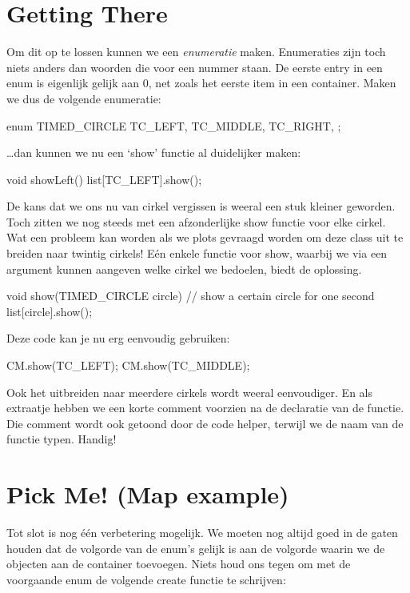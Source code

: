\section{Getting There}

Om dit op te lossen kunnen we een \textsl{enumeratie} maken. Enumeraties zijn toch niets anders dan woorden die voor een nummer staan. De eerste entry in een enum is eigenlijk gelijk aan 0, net zoals het eerste item in een container. Maken we dus de volgende enumeratie:

\begin{code}
enum TIMED_CIRCLE {
  TC_LEFT,
  TC_MIDDLE,
  TC_RIGHT,
};
\end{code}

\ldots dan kunnen we nu een `show' functie al duidelijker maken:

\begin{code}
void showLeft() {
  list[TC_LEFT].show();
}
\end{code}

De kans dat we ons nu van cirkel vergissen is weeral een stuk kleiner geworden. Toch zitten we nog steeds met een afzonderlijke show functie voor elke cirkel. Wat een probleem kan worden als we plots gevraagd worden om deze class uit te breiden naar twintig cirkels! E\'en enkele functie voor show, waarbij we via een argument kunnen aangeven welke cirkel we bedoelen, biedt de oplossing.

\begin{code}
void show(TIMED_CIRCLE circle) { // show a certain circle for one second
  list[circle].show();
}
\end{code}

Deze code kan je nu erg eenvoudig gebruiken:
\begin{code}
CM.show(TC_LEFT);
CM.show(TC_MIDDLE);
\end{code}

Ook het uitbreiden naar meerdere cirkels wordt weeral eenvoudiger. En als extraatje hebben we een korte comment voorzien na de declaratie van de functie. Die comment wordt ook getoond door de code helper, terwijl we de naam van de functie typen. Handig!

\section{Pick Me! (Map example)}

Tot slot is nog \'e\'en verbetering mogelijk. We moeten nog altijd goed in de gaten houden dat de volgorde van de enum's gelijk is aan de volgorde waarin we de objecten aan de container toevoegen. Niets houd ons tegen om met de voorgaande enum de volgende create functie te schrijven:

